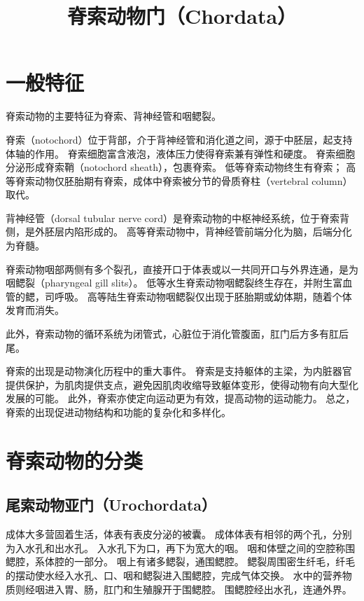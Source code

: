 \documentclass[11pt]{article}
\title{脊索动物门（Chordata）}
\date{}
\begin{document}
  \maketitle

  \linenumbers
  
\section{一般特征}
脊索动物的主要特征为脊索、背神经管和咽鳃裂。

\newline

脊索（notochord）位于背部，介于背神经管和消化道之间，源于中胚层，起支持体轴的作用。
脊索细胞富含液泡，液体压力使得脊索兼有弹性和硬度。
脊索细胞分泌形成脊索鞘（notochord sheath），包裹脊索。
低等脊索动物终生有脊索；
高等脊索动物仅胚胎期有脊索，成体中脊索被分节的骨质脊柱（vertebral column）取代。

\newline

背神经管（dorsal tubular nerve cord）是脊索动物的中枢神经系统，位于脊索背侧，是外胚层内陷形成的。
高等脊索动物中，背神经管前端分化为脑，后端分化为脊髓。

\newline

脊索动物咽部两侧有多个裂孔，直接开口于体表或以一共同开口与外界连通，是为咽鳃裂（pharyngeal gill slits）。
低等水生脊索动物咽鳃裂终生存在，并附生富血管的鳃，司呼吸。
高等陆生脊索动物咽鳃裂仅出现于胚胎期或幼体期，随着个体发育而消失。

\newline

此外，脊索动物的循环系统为闭管式，心脏位于消化管腹面，肛门后方多有肛后尾。

\newline

脊索的出现是动物演化历程中的重大事件。
脊索是支持躯体的主梁，为内脏器官提供保护，为肌肉提供支点，避免因肌肉收缩导致躯体变形，使得动物有向大型化发展的可能。
此外，脊索亦使定向运动更为有效，提高动物的运动能力。
总之，脊索的出现促进动物结构和功能的复杂化和多样化。
  
\section{脊索动物的分类}
\subsection{尾索动物亚门（Urochordata）}
成体大多营固着生活，体表有表皮分泌的被囊。
成体体表有相邻的两个孔，分别为入水孔和出水孔。
入水孔下为口，再下为宽大的咽。
咽和体壁之间的空腔称围鳃腔，系体腔的一部分。
咽上有诸多鳃裂，通围鳃腔。
鳃裂周围密生纤毛，纤毛的摆动使水经入水孔、口、咽和鳃裂进入围鳃腔，完成气体交换。
水中的营养物质则经咽进入胃、肠，肛门和生殖腺开于围鳃腔。
围鳃腔经出水孔，连通外界。
\end{document}
